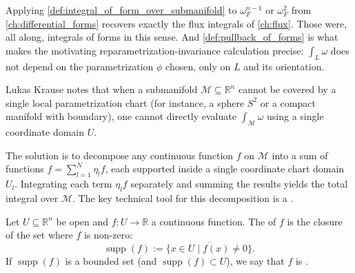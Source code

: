 \begin{ainote}
Applying \cref{def:integral_of_form_over_submanifold} to $\omega_F^{n-1}$ or $\omega_F^2$ from
\cref{ch:differential_forms} recovers exactly the flux integrals of \cref{ch:flux}. Those were,
all along, integrals of forms in this sense. And \cref{def:pullback_of_forms} is what makes the
motivating reparametrization-invariance calculation precise: $\int_L \omega$ does
not depend on the parametrization $\phi$ chosen, only on $L$ and its orientation.
\end{ainote}

\begin{ainote}
\label{note:partitions_of_unity_motivation}
Lukas Krause notes that when a submanifold $\mathcal{M} \subseteq \mathbb{R}^n$ cannot be covered by a single local parametrization chart (for instance, a sphere $S^2$ or a compact manifold with boundary), one cannot directly evaluate $\int_{\mathcal{M}} \omega$ using a single coordinate domain $U$. 

The solution is to decompose any continuous function $f$ on $\mathcal{M}$ into a sum of functions $f = \sum_{l=1}^N \eta_l f$, each supported inside a single coordinate chart domain $U_l$. Integrating each term $\eta_l f$ separately and summing the results yields the total integral over $\mathcal{M}$. The key technical tool for this decomposition is a  .
\end{ainote}

\begin{definition}
\label{def:support_of_function}
Let $U \subseteq \mathbb{R}^n$ be open and $f: U \to \mathbb{R}$ a continuous function. The   of $f$ is the closure of the set where $f$ is non-zero:
\[
\operatorname{supp}(f) := \overline{\{x \in U \mid f(x) \neq 0\}}.
\]
If $\operatorname{supp}(f)$ is a bounded set (and $\operatorname{supp}(f) \subset U$), we say that $f$ is  .
\end{definition}

